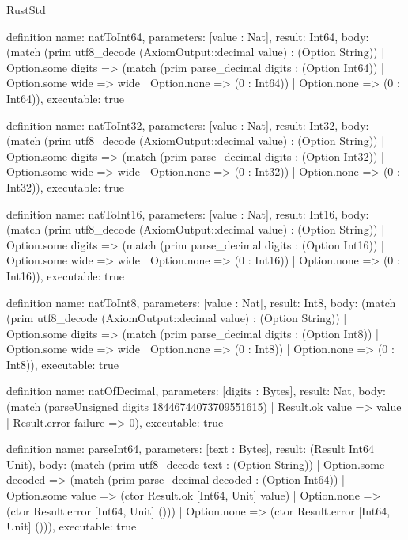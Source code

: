 \begin{lexlean}{RustStd}
\begin{semanticmodule}
definition{
  name: natToInt64,
  parameters: [value : Nat],
  result: Int64,
  body: (match (prim utf8_decode (AxiomOutput::decimal value) : (Option String)) | Option.some digits => (match (prim parse_decimal digits : (Option Int64)) | Option.some wide => wide | Option.none => (0 : Int64)) | Option.none => (0 : Int64)),
  executable: true
}

definition{
  name: natToInt32,
  parameters: [value : Nat],
  result: Int32,
  body: (match (prim utf8_decode (AxiomOutput::decimal value) : (Option String)) | Option.some digits => (match (prim parse_decimal digits : (Option Int32)) | Option.some wide => wide | Option.none => (0 : Int32)) | Option.none => (0 : Int32)),
  executable: true
}

definition{
  name: natToInt16,
  parameters: [value : Nat],
  result: Int16,
  body: (match (prim utf8_decode (AxiomOutput::decimal value) : (Option String)) | Option.some digits => (match (prim parse_decimal digits : (Option Int16)) | Option.some wide => wide | Option.none => (0 : Int16)) | Option.none => (0 : Int16)),
  executable: true
}

definition{
  name: natToInt8,
  parameters: [value : Nat],
  result: Int8,
  body: (match (prim utf8_decode (AxiomOutput::decimal value) : (Option String)) | Option.some digits => (match (prim parse_decimal digits : (Option Int8)) | Option.some wide => wide | Option.none => (0 : Int8)) | Option.none => (0 : Int8)),
  executable: true
}

definition{
  name: natOfDecimal,
  parameters: [digits : Bytes],
  result: Nat,
  body: (match (parseUnsigned digits 18446744073709551615) | Result.ok value => value | Result.error failure => 0),
  executable: true
}

definition{
  name: parseInt64,
  parameters: [text : Bytes],
  result: (Result Int64 Unit),
  body: (match (prim utf8_decode text : (Option String)) | Option.some decoded => (match (prim parse_decimal decoded : (Option Int64)) | Option.some value => (ctor Result.ok [Int64, Unit] value) | Option.none => (ctor Result.error [Int64, Unit] ())) | Option.none => (ctor Result.error [Int64, Unit] ())),
  executable: true
}


\end{semanticmodule}
\end{lexlean}
